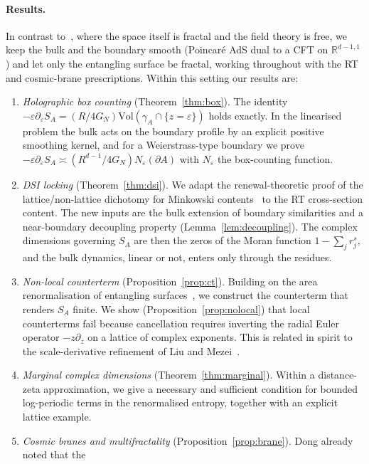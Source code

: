 \documentclass[11pt]{article}
\theoremstyle{definition}\newtheorem{definition}{Definition}[section]
\theoremstyle{remark}\newtheorem*{remark}{Remark}
\newcommand{\RR}{\mathbb{R}}
\newcommand{\Vol}{\mathrm{Vol}}
\newcommand{\GN}{G_N}
\begin{document}
\paragraph{Results.}
In contrast to~\cite{FarajiAstaneh}, where the space itself is fractal and the field theory is free, we keep
the bulk and the boundary smooth (Poincar\'e AdS dual to a CFT on $\RR^{d-1,1}$) and let only the entangling
surface be fractal, working throughout with the RT and cosmic-brane prescriptions. Within this setting our
results are:
\begin{enumerate}
\item \emph{Holographic box counting} (Theorem~\ref{thm:box}). The identity
$-\varepsilon\partial_\varepsilon S_A=(R/4\GN)\Vol(\gamma_A\cap\{z=\varepsilon\})$ holds exactly. In the
linearised problem the bulk acts on the boundary profile by an explicit positive smoothing kernel, and for a
Weierstrass-type boundary we prove $-\varepsilon\partial_\varepsilon S_A\asymp(R^{d-1}/4\GN)N_\varepsilon(\partial A)$
with $N_\varepsilon$ the box-counting function.
\item \emph{DSI locking} (Theorem~\ref{thm:dsi}). We adapt the renewal-theoretic proof of the
lattice/non-lattice dichotomy for Minkowski contents~\cite{LvF,Lalley,FalconerMink,Gatzouras} to the RT
cross-section content. The new inputs are the bulk extension of boundary similarities and a near-boundary
decoupling property (Lemma~\ref{lem:decoupling}). The complex dimensions governing $S_A$ are then the zeros
of the Moran function $1-\sum_j r_j^s$, and the bulk dynamics, linear or not, enters only through the
residues.
\item \emph{Non-local counterterm} (Proposition~\ref{prop:ct}). Building on the area renormalisation of
entangling surfaces~\cite{GW,TaylorWoodhead}, we construct the counterterm that renders $S_A$ finite. We show
(Proposition~\ref{prop:nolocal}) that local counterterms fail because cancellation requires inverting the
radial Euler operator $-z\partial_z$ on a lattice of complex exponents. This is related in spirit to the
scale-derivative refinement of Liu and Mezei~\cite{LiuMezei}.
\item \emph{Marginal complex dimensions} (Theorem~\ref{thm:marginal}). Within a distance-zeta
approximation, we give a necessary and sufficient condition for bounded log-periodic terms in the
renormalised entropy, together with an explicit lattice example.
\item \emph{Cosmic branes and multifractality} (Proposition~\ref{prop:brane}). Dong already noted that the

\end{enumerate}
\end{document}

